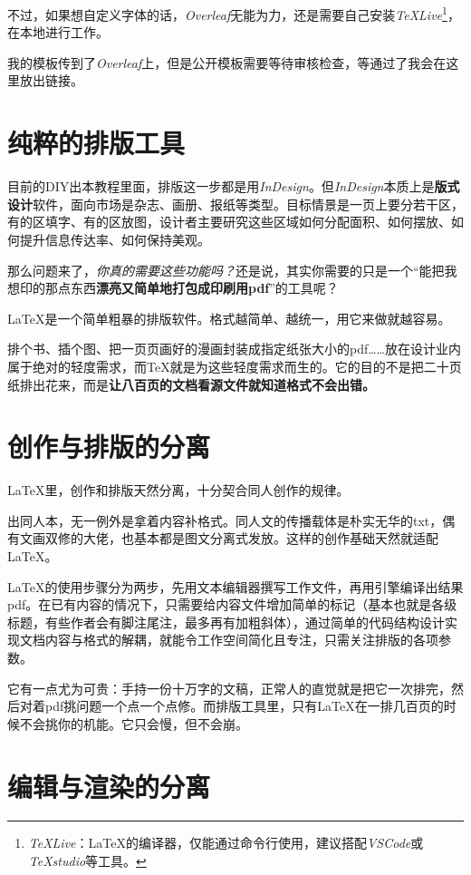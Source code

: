 \documentclass[10pt,openany]{book}
\begin{document}
不过，如果想自定义字体的话，\textit{Overleaf}无能为力，还是需要自己安装\textit{TeXLive}\footnote{\textit{TeXLive}：{\LaTeX}的编译器，仅能通过命令行使用，建议搭配\textit{VSCode}或\textit{TeXstudio}等工具。}，在本地进行工作。

我的模板传到了\textit{Overleaf}上，但是公开模板需要等待审核检查，等通过了我会在这里放出链接。

\section{纯粹的排版工具}

目前的DIY出本教程里面，排版这一步都是用\textit{InDesign}。但\textit{InDesign}本质上是\textbf{版式设计}软件，面向市场是杂志、画册、报纸等类型。目标情景是一页上要分若干区，有的区填字、有的区放图，设计者主要研究这些区域如何分配面积、如何摆放、如何提升信息传达率、如何保持美观。

那么问题来了，\emph{你真的需要这些功能吗？}还是说，其实你需要的只是一个“能把我想印的那点东西\textbf{漂亮又简单地打包成印刷用pdf}”的工具呢？

{\LaTeX}是一个简单粗暴的排版软件。格式越简单、越统一，用它来做就越容易。

排个书、插个图、把一页页画好的漫画封装成指定纸张大小的pdf……放在设计业内属于绝对的轻度需求，而{\TeX}就是为这些轻度需求而生的。它的目的不是把二十页纸排出花来，而是\textbf{让八百页的文档看源文件就知道格式不会出错。}

\section{创作与排版的分离}

 {\LaTeX}里，创作和排版天然分离，十分契合同人创作的规律。

出同人本，无一例外是拿着内容补格式。同人文的传播载体是朴实无华的txt，偶有文画双修的大佬，也基本都是图文分离式发放。这样的创作基础天然就适配{\LaTeX}。

{\LaTeX}的使用步骤分为两步，先用文本编辑器撰写工作文件，再用引擎编译出结果pdf。在已有内容的情况下，只需要给内容文件增加简单的标记（基本也就是各级标题，有些作者会有脚注尾注，最多再有加粗斜体），通过简单的代码结构设计实现文档内容与格式的解耦，就能令工作空间简化且专注，只需关注排版的各项参数。

它有一点尤为可贵：手持一份十万字的文稿，正常人的直觉就是把它一次排完，然后对着pdf挑问题一个点一个点修。而排版工具里，只有{\LaTeX}在一排几百页的时候不会挑你的机能。它只会慢，但不会崩。

\section{编辑与渲染的分离}
\end{document}
